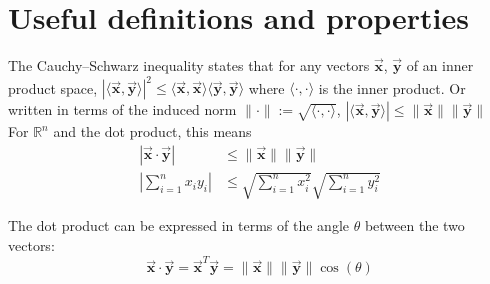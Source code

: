 \documentclass[9pt, headings=standardclasses, parskip=half]{scrartcl}
\renewcommand{\emph}[1]{\textcolor{mypurple}{#1}}
\newcommand{\vect}[1]{\vec{\boldsymbol{#1}}}
\begin{document}
\clearpage
\section{Useful definitions and properties}

\tikzexternaldisable
\begin{theorem}
  The \emph{Cauchy--Schwarz inequality} states that for any vectors \(\vect{x}\), \(\vect{y}\) of an inner product space,
  \(
  |\langle \vect{x}, \vect{y} \rangle|^{2} \leq \langle \vect{x}, \vect{x} \rangle \langle \vect{y}, \vect{y} \rangle
  \)
  where \(\langle \cdot, \cdot \rangle\) is the inner product. Or written in terms of the induced norm \(\|\cdot\|:=\sqrt{\langle \cdot, \cdot \rangle}\),
  \(
  |\langle \vect{x}, \vect{y} \rangle| \leq \|\vect{x}\| \|\vect{y}\|
  \)
  For \(\mathbb{R}^{n}\) and the dot product, this means
  \[
  \begin{aligned}
  |\vect{x} \cdot \vect{y}| &\leq \|\vect{x}\| \|\vect{y}\| \\
  \left|\sum_{i=1}^{n} x_{i}y_{i}\right| &\leq \sqrt{\sum_{i=1}^{n} x_{i}^{2}} \sqrt{\sum_{i=1}^{n} y_{i}^{2}} %
  \end{aligned}
  \]
\end{theorem}
The dot product can be expressed in terms of the angle \(\theta\) between the two vectors:
\[
\vect{x} \cdot \vect{y} = \vect{x}^{T}\vect{y} = \|\vect{x}\| \|\vect{y}\| \cos(\theta) %
\]
\end{document}

